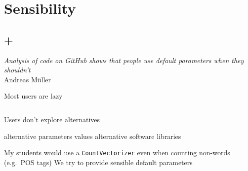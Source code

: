 \documentclass[aspectratio=169, 22pt]{beamer}
\newenvironment{sectionslide}
			{\subsection*{+}\begin{frame}[fragile,environment=sectionslide]\vfill\begin{center}\Large}
			{\end{center}\vfill\end{frame}}
\begin{document}
\section{Sensibility}

\begin{sectionslide}
	\emph{Analysis of code on GitHub shows that people use default parameters when they shouldn't} \\
	\raggedleft Andreas M\"uller
\end{sectionslide}

\begin{plain}{Most users are lazy}
	\begin{columns}[t]\begin{column}{.65\textwidth}
		\vspace{-2em}
	\begin{itemize}
	\p Users don't explore alternatives
	\begin{itemize}
		\p alternative parameters values
		\p alternative software libraries
	\end{itemize}
	\p My students would use a \verb|CountVectorizer| even when counting non-words (e.g.\ POS tags)
	\p We try to provide sensible default parameters
	\end{itemize}
	\vfill
\end{column}
\begin{column}{.39\textwidth}
	\vspace*{-50pt}

\end{column}
\end{columns}
\end{plain}
\end{document}
